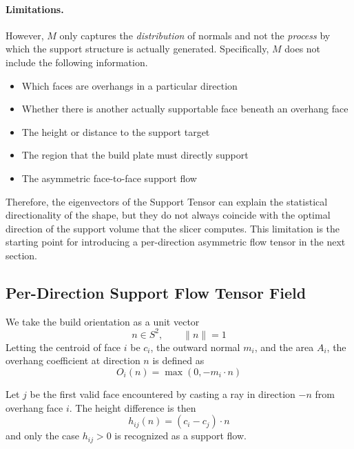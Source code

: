 \documentclass[11pt,a4paper]{article}
\begin{document}
\paragraph{Limitations.}
However, $M$ only captures the \emph{distribution} of normals and not the \emph{process} by which the support structure is actually generated.
Specifically, $M$ does not include the following information.

\begin{itemize}
\item Which faces are overhangs in a particular direction
\item Whether there is another actually supportable face beneath an overhang face
\item The height or distance to the support target
\item The region that the build plate must directly support
\item The asymmetric face-to-face support flow
\end{itemize}

Therefore, the eigenvectors of the Support Tensor can explain the statistical directionality of the shape,
but they do not always coincide with the optimal direction of the support volume that the slicer computes.
This limitation is the starting point for introducing a per-direction asymmetric flow tensor in the next section.

\subsection{Per-Direction Support Flow Tensor Field}
\label{sec:sftf}

We take the build orientation as a unit vector
\begin{equation}
n\in S^2, \qquad \|n\|=1
\end{equation}
Letting the centroid of face $i$ be $c_i$, the outward normal $m_i$, and the area $A_i$,
the overhang coefficient at direction $n$ is defined as
\begin{equation}
O_i(n)=\max(0,-m_i\cdot n)
\end{equation}

Let $j$ be the first valid face encountered by casting a ray in direction $-n$ from overhang face $i$.
The height difference is then
\begin{equation}
h_{ij}(n)=(c_i-c_j)\cdot n
\end{equation}
and only the case $h_{ij}>0$ is recognized as a support flow.
\end{document}
